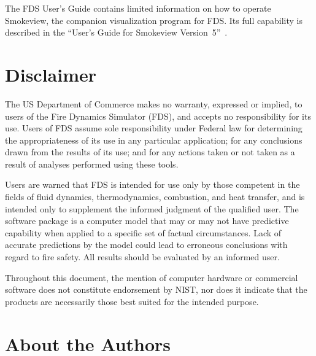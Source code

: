 \documentclass[11pt]{book}
\begin{document}
The FDS User's Guide contains limited information on how to operate Smokeview, the companion
visualization program for FDS. Its full capability is described in the ``User's Guide for
Smokeview Version~5''~\cite{Smokeview_Users_Guide_5}.


\chapter{Disclaimer}

The US Department of Commerce makes no warranty, expressed or implied, to
users of the Fire Dynamics Simulator (FDS), and accepts no responsibility for its
use. Users of FDS assume sole responsibility under Federal law for
determining the appropriateness of its use in any particular application;
for any conclusions drawn from the results of its use; and for any actions
taken or not taken as a result of analyses performed using these tools.

Users are warned that FDS is intended for use only by those competent in
the fields of fluid dynamics, thermodynamics, combustion, and heat transfer,
and is intended only to supplement the
informed judgment of the qualified user. The software package is a
computer model that may or may not have predictive capability when applied
to a specific set of factual circumstances. Lack of accurate predictions by
the model could lead to erroneous conclusions with regard to fire safety.
All results should be evaluated by an informed user.

Throughout this document, the mention of computer hardware or
commercial software does not constitute endorsement by NIST, nor does
it indicate that the products are necessarily those best suited for the
intended purpose.


\chapter{About the Authors}
\end{document}
